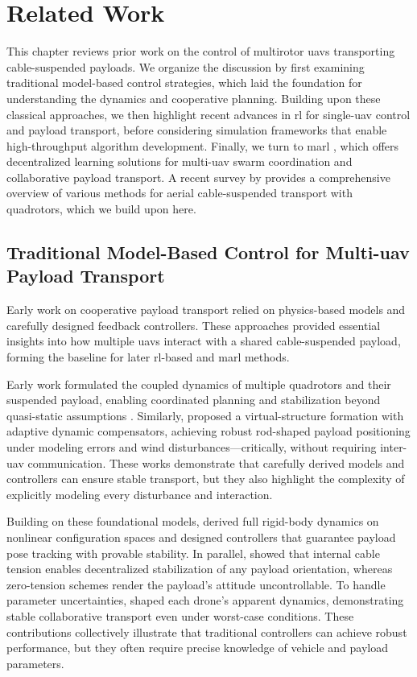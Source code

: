 \chapter{Related Work}
This chapter reviews prior work on the control of multirotor \gls{uav}s transporting cable-suspended payloads. We organize the discussion by first examining traditional model-based control strategies, which laid the foundation for understanding the dynamics and cooperative planning. Building upon these classical approaches, we then highlight recent advances in \gls{rl} for single-\gls{uav} control and payload transport, before considering simulation frameworks that enable high-throughput algorithm development. Finally, we turn to \Gls{marl} \autocite{littman1994markov}, which offers decentralized learning solutions for multi-\gls{uav} swarm coordination and collaborative payload transport. A recent survey by \cite{estevez_review_2024} provides a comprehensive overview of various methods for aerial cable-suspended transport with quadrotors, which we build upon here.

\section{Traditional Model-Based Control for Multi-\gls{uav} Payload Transport}
Early work on cooperative payload transport relied on physics-based models and carefully designed feedback controllers. These approaches provided essential insights into how multiple \gls{uav}s interact with a shared cable-suspended payload, forming the baseline for later \gls{rl}-based and \gls{marl} methods.

Early work formulated the coupled dynamics of multiple quadrotors and their suspended payload, enabling coordinated planning and stabilization beyond quasi-static assumptions \cite{sreenath_dynamics_2013}. Similarly, \cite{villa_cooperative_2021} proposed a virtual-structure formation with adaptive dynamic compensators, achieving robust rod-shaped payload positioning under modeling errors and wind disturbances—critically, without requiring inter-\gls{uav} communication. These works demonstrate that carefully derived models and controllers can ensure stable transport, but they also highlight the complexity of explicitly modeling every disturbance and interaction.

Building on these foundational models, \cite{lee_geometric_2018} derived full rigid-body dynamics on nonlinear configuration spaces and designed controllers that guarantee payload pose tracking with provable stability. In parallel, \cite{tognon_aerial_2018} showed that internal cable tension enables decentralized stabilization of any payload orientation, whereas zero-tension schemes render the payload's attitude uncontrollable. To handle parameter uncertainties, \cite{tagliabue_robust_2017} shaped each drone's apparent dynamics, demonstrating stable collaborative transport even under worst-case conditions. These contributions collectively illustrate that traditional controllers can achieve robust performance, but they often require precise knowledge of vehicle and payload parameters.

